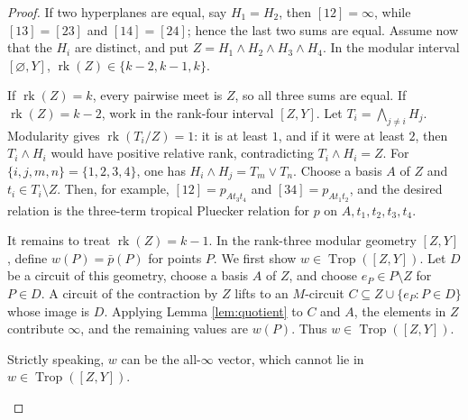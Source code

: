 \documentclass[12pt]{article}
\theoremstyle{definition}
\newcommand{\Trop}{\operatorname{Trop}}
\newcommand{\rk}{\operatorname{rk}}
\newcommand{\review}[1]{\begin{reviewbox}#1\end{reviewbox}}
\begin{document}
\begin{proof}
If two hyperplanes are equal, say \(H_1=H_2\), then \([12]=\infty\), while \([13]=[23]\) and \([14]=[24]\); hence the last two sums are equal.  Assume now that the \(H_i\) are distinct, and put \(Z=H_1\wedge H_2\wedge H_3\wedge H_4\).  In the modular interval \([\varnothing,Y]\), \(\rk(Z)\in\{k-2,k-1,k\}\).

If \(\rk(Z)=k\), every pairwise meet is \(Z\), so all three sums are equal.  If \(\rk(Z)=k-2\), work in the rank-four interval \([Z,Y]\).  Let \(T_i=\bigwedge_{j\ne i}H_j\).  Modularity gives \(\rk(T_i/Z)=1\): it is at least \(1\), and if it were at least \(2\), then \(T_i\wedge H_i\) would have positive relative rank, contradicting \(T_i\wedge H_i=Z\).  For \(\{i,j,m,n\}=\{1,2,3,4\}\), one has \(H_i\wedge H_j=T_m\vee T_n\).  Choose a basis \(A\) of \(Z\) and \(t_i\in T_i\setminus Z\).  Then, for example, \([12]=p_{A t_3t_4}\) and \([34]=p_{A t_1t_2}\), and the desired relation is the three-term tropical Pluecker relation for \(p\) on \(A,t_1,t_2,t_3,t_4\).

It remains to treat \(\rk(Z)=k-1\).  In the rank-three modular geometry \([Z,Y]\), define \(w(P)=\bar p(P)\) for points \(P\).  We first show \(w\in\Trop([Z,Y])\).  Let \(D\) be a circuit of this geometry, choose a basis \(A\) of \(Z\), and choose \(e_P\in P\setminus Z\) for \(P\in D\).  A circuit of the contraction by \(Z\) lifts to an \(M\)-circuit \(C\subseteq Z\cup\{e_P:P\in D\}\) whose image is \(D\).  Applying Lemma \ref{lem:quotient} to \(C\) and \(A\), the elements in \(Z\) contribute \(\infty\), and the remaining values are \(w(P)\).  Thus \(w\in\Trop([Z,Y])\).

\review{Strictly speaking, $w$ can be the all-$\infty$ vector, which cannot lie in \(w\in\Trop([Z,Y])\).}


\end{proof}
\end{document}
